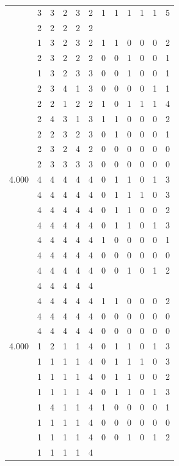 \documentclass[]{book}
\theoremstyle{definition}
\theoremstyle{definition}
\theoremstyle{definition}
\theoremstyle{remark}
\begin{document}
\begin{table}
{\begin{tabular}[t]{rrrrrrrrrrrr}
 & 3 & 3 & 2 & 3 & 2 & 1 & 1 & 1 & 1 & 1 & 5\\
 & 2 & 2 & 2 & 2 & 2 &  &  &  &  &  & \\
 & 1 & 3 & 2 & 3 & 2 & 1 & 1 & 0 & 0 & 0 & 2\\
 & 2 & 3 & 2 & 2 & 2 & 0 & 0 & 1 & 0 & 0 & 1\\
 & 1 & 3 & 2 & 3 & 3 & 0 & 0 & 1 & 0 & 0 & 1\\
 & 2 & 3 & 4 & 1 & 3 & 0 & 0 & 0 & 0 & 1 & 1\\
 & 2 & 2 & 1 & 2 & 2 & 1 & 0 & 1 & 1 & 1 & 4\\
 & 2 & 4 & 3 & 1 & 3 & 1 & 1 & 0 & 0 & 0 & 2\\
 & 2 & 2 & 3 & 2 & 3 & 0 & 1 & 0 & 0 & 0 & 1\\
 & 2 & 3 & 2 & 4 & 2 & 0 & 0 & 0 & 0 & 0 & 0\\
 & 2 & 3 & 3 & 3 & 3 & 0 & 0 & 0 & 0 & 0 & 0\\
4.000 & 4 & 4 & 4 & 4 & 4 & 0 & 1 & 1 & 0 & 1 & 3\\
 & 4 & 4 & 4 & 4 & 4 & 0 & 1 & 1 & 1 & 0 & 3\\
 & 4 & 4 & 4 & 4 & 4 & 0 & 1 & 1 & 0 & 0 & 2\\
 & 4 & 4 & 4 & 4 & 4 & 0 & 1 & 1 & 0 & 1 & 3\\
 & 4 & 4 & 4 & 4 & 4 & 1 & 0 & 0 & 0 & 0 & 1\\
 & 4 & 4 & 4 & 4 & 4 & 0 & 0 & 0 & 0 & 0 & 0\\
 & 4 & 4 & 4 & 4 & 4 & 0 & 0 & 1 & 0 & 1 & 2\\
 & 4 & 4 & 4 & 4 & 4 &  &  &  &  &  & \\
 & 4 & 4 & 4 & 4 & 4 & 1 & 1 & 0 & 0 & 0 & 2\\
 & 4 & 4 & 4 & 4 & 4 & 0 & 0 & 0 & 0 & 0 & 0\\
 & 4 & 4 & 4 & 4 & 4 & 0 & 0 & 0 & 0 & 0 & 0\\
4.000 & 1 & 2 & 1 & 1 & 4 & 0 & 1 & 1 & 0 & 1 & 3\\
 & 1 & 1 & 1 & 1 & 4 & 0 & 1 & 1 & 1 & 0 & 3\\
 & 1 & 1 & 1 & 1 & 4 & 0 & 1 & 1 & 0 & 0 & 2\\
 & 1 & 1 & 1 & 1 & 4 & 0 & 1 & 1 & 0 & 1 & 3\\
 & 1 & 4 & 1 & 1 & 4 & 1 & 0 & 0 & 0 & 0 & 1\\
 & 1 & 1 & 1 & 1 & 4 & 0 & 0 & 0 & 0 & 0 & 0\\
 & 1 & 1 & 1 & 1 & 4 & 0 & 0 & 1 & 0 & 1 & 2\\
 & 1 & 1 & 1 & 1 & 4 &  &  &  &  &  & \\

\end{tabular}}
\end{table}
\end{document}
